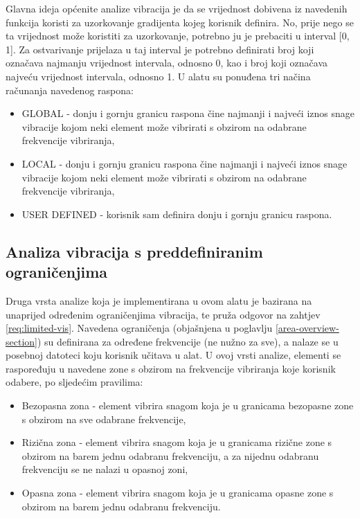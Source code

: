 \documentclass[times, utf8, diplomski]{fer}
\begin{document}
Glavna ideja općenite analize vibracija je da se vrijednost dobivena iz navedenih funkcija koristi za uzorkovanje gradijenta kojeg korisnik definira. No, prije nego se ta vrijednost može koristiti za uzorkovanje, potrebno ju je prebaciti u interval [0, 1]. Za ostvarivanje prijelaza u taj interval je potrebno definirati broj koji označava najmanju vrijednost intervala, odnosno 0, kao i broj koji označava najveću vrijednost intervala, odnosno 1. U alatu su ponuđena tri načina računanja navedenog raspona:

\begin{itemize}
\item GLOBAL - donju i gornju granicu raspona čine najmanji i najveći iznos snage vibracije kojom neki element može vibrirati s obzirom na odabrane frekvencije vibriranja,
\item LOCAL - donju i gornju granicu raspona čine najmanji i najveći iznos snage vibracije kojom neki element može vibrirati s obzirom na odabrane frekvencije vibriranja,
\item USER DEFINED - korisnik sam definira donju i gornju granicu raspona.\\
\end{itemize}

\subsection{Analiza vibracija s preddefiniranim ograničenjima} \label{limits-mode-section}

Druga vrsta analize koja je implementirana u ovom alatu je bazirana na unaprijed određenim ograničenjima vibracija, te pruža odgovor na zahtjev \ref{req:limited-vis}. Navedena ograničenja (objašnjena u poglavlju \ref{area-overview-section}) su definirana za određene frekvencije (ne nužno za sve), a nalaze se u posebnoj datoteci koju korisnik učitava u alat. U ovoj vrsti analize, elementi se raspoređuju u navedene zone s obzirom na frekvencije vibriranja koje korisnik odabere, po sljedećim pravilima:

\begin{itemize}
\item Bezopasna zona - element vibrira snagom koja je u granicama bezopasne zone s obzirom na sve odabrane frekvencije,
\item Rizična zona - element vibrira snagom koja je u granicama rizične zone s obzirom na barem jednu odabranu frekvenciju, a za nijednu odabranu frekvenciju se ne nalazi u opasnoj zoni,
\item Opasna zona - element vibrira snagom koja je u granicama opasne zone s obzirom na barem jednu odabranu frekvenciju.\\
\end{itemize}
\end{document}
